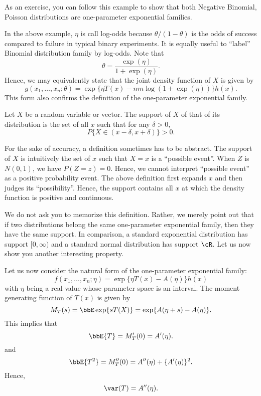 As an exercise, you can follow this example to show that
both Negative Binomial, Poisson distributions are one-parameter
exponential families. 

In the above example, $\eta$ is call log-odds because
$\theta/(1-\theta)$ is the odds of success compared to failure
in typical binary experiments. It is equally useful to ``label''
Binomial distribution family by log-odds.
Note that
\[
\theta = \frac{ \exp(\eta)}{1 + \exp(\eta)}.
\]
Hence, we may equivalently state that the joint density
function of $X$ is given by
\[
g(x_1, \ldots, x_n; \theta)
=
\exp \{ \eta T(x) - nm\log (1+ \exp(\eta)) \} h(x).
\]
This form also confirms the definition of the one-parameter
exponential family.

\begin{defi}
Let $X$ be a random variable or vector. The support of $X$
of that of its distribution is the set of all $x$ such that
for any $\delta > 0$,
\[
P\{ X \in (x-\delta, x+\delta) \} > 0.
\]
\end{defi}

For the sake of accuracy, a definition sometimes has to be abstract.
The support of $X$ is intuitively the set of $x$ such that
$X=x$ is a ``possible event''. When $Z$ is $N(0, 1)$, we
have $P(Z = z) = 0$. Hence, we cannot interpret ``possible
event'' as a positive probability event. The above definition
first expands $x$ and then judges its ``possibility''.
Hence, the support contains all $x$ at which the density
function is positive and continuous.

We do not ask you to memorize this definition. Rather, we
merely point out that if two distributions belong the same one-parameter
exponential family, then they have the same support.
In comparison, a standard exponential distribution has
support $[0, \infty)$ and a standard normal distribution
has support $\cR$.
Let us now show you another interesting property.

\begin{example}
Let us now consider the natural form of the one-parameter
exponential family:
\[
f(x_1, \ldots, x_n; \eta)
=
\exp \{ \eta T(x) - A(\eta) \} h(x)
\]
with $\eta$ being a real value whose parameter space
is an interval.
The moment generating function of $T(x)$ is given by
\[
M_T(s) = \bbE \exp \{ s T(X)\}
= \exp\{ A(\eta+s) - A(\eta) \}.
\]
This implies that
\[
\bbE\{T\} = M'_T(0) = A'(\eta).
\]
and
\[
\bbE\{T^2\} = M''_T(0) = A''(\eta) + \{A'(\eta)\}^2.
\]
Hence,
\[
\var(T) = A''(\eta).
\]
\end{example}

